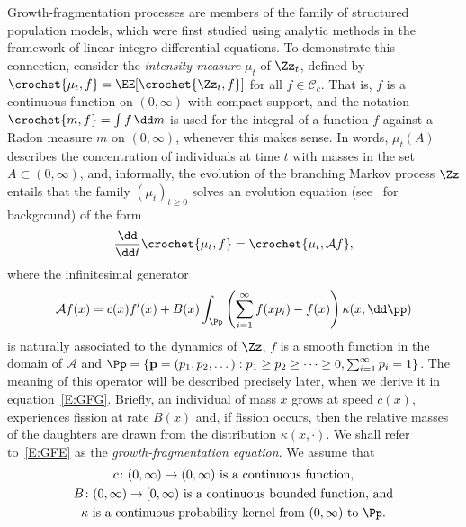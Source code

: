 Growth-fragmentation processes are members of the family of structured population models, which were first studied using analytic methods in the framework of linear integro-differential equations. To demonstrate this connection, consider the \emph{intensity measure} $\mu_t$ of $\Zz_t$, defined by $\crochet{\mu_t,f} = \EE[\crochet{ \Zz_t,f}]$ for all $f\in{\mathcal C}_c$. That is, $f$ is a continuous function on $(0,\infty)$ with compact support, and the notation $\crochet{m,f} = \int f \, \dd m$ is used for the integral of a function $f$ against a Radon measure $m$ on $(0,\infty)$, whenever this makes sense. In words, $\mu_t(A)$ describes the concentration of individuals at time $t$ with masses in the set $A\subset (0,\infty)$, and, informally, the evolution of the branching Markov process $\Zz$ entails that the family $(\mu_t)_{t\geq 0}$ solves an evolution equation (see~\cite{EN00} for background) of the form
\begin{equation}\label{E:GFE}
\frac{\dd }{\dd t} \crochet{\mu_t,f}= \crochet{ \mu_t, {\mathcal A} f},
\end{equation}
where the infinitesimal generator
\[
{\mathcal A}f(x) = c(x) f'(x) + {B}(x) \int_{\Pp} \left(\sum_{i=1}^{\infty}f(xp_i)-f(x)\right)\kappa(x, \dd \pp)
\]
is naturally associated to the dynamics of $\Zz$, $f$ is a smooth function in the domain of ${\mathcal A}$ and $\Pp = \{ \mathbf{p} = (p_1,p_2,\dotsc) : p_1 \ge p_2 \ge \dotsb \ge 0, \sum_{i=1}^\infty p_i = 1\}$. The meaning of this operator will be described precisely later, when we derive it in equation~\eqref{E:GFG}. Briefly, an individual of mass $x$ grows at speed $c(x)$, experiences fission at rate $B(x)$ and, if fission occurs, then the relative masses of the daughters are drawn from the distribution $\kappa(x,\cdot)$. We shall refer to~\eqref{E:GFE} as the \emph{growth-fragmentation equation}. We assume that
\begin{gather}
c\colon (0,\infty)\to (0,\infty) \text{ is a continuous function,}\label{e:assump-c}
\\
B\colon (0,\infty) \to [0,\infty) \text{ is a continuous bounded function, and}\label{e:assump-B}
\\
\kappa \text{ is a continuous probability kernel from } (0,\infty) \text{ to } \Pp.\label{e:assump-kappa}
\end{gather}

